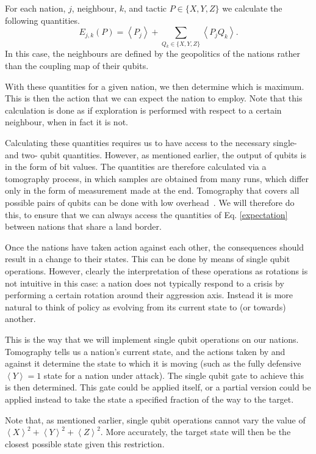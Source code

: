 \documentclass[conference]{IEEEtran}
\begin{document}
For each nation, $j$, neighbour, $k$, and tactic $P  \in \{X,Y,Z\}$ we calculate the following quantities.
\begin{equation} \label{expectation}
E_{j,k} (P) = \left\langle P_j \right\rangle + \sum_{Q_k \in \{X,Y,Z\} } \left\langle P_j Q_k\right\rangle.
\end{equation}
In this case, the neighbours are defined by the geopolitics of the nations rather than the coupling map of their qubits.

With these quantities for a given nation, we then determine which is maximum. This is then the action that we can expect the nation to employ. Note that this calculation is done as if exploration is performed with respect to a certain neighbour, when in fact it is not.

Calculating these quantities requires us to have access to the necessary single- and two- qubit quantities. However, as mentioned earlier, the output of qubits is in the form of bit values. The quantities are therefore calculated via a tomography process, in which samples are obtained from many runs, which differ only in the form of measurement made at the end. Tomography that covers all possible pairs of qubits can be done with low overhead~\cite{garciaperez:19}. We will therefore do this, to ensure that we can always access the quantities of Eq. \ref{expectation} between nations that share a land border.

Once the nations have taken action against each other, the consequences should result in a change to their states. This can be done by means of single qubit operations. However, clearly the interpretation of these operations as rotations is not intuitive in this case: a nation does not typically respond to a crisis by performing a certain rotation around their aggression axis. Instead it is more natural to think of policy as evolving from its current state to (or towards) another.

This is the way that we will implement single qubit operations on our nations. Tomography tells us a nation's current state, and the actions taken by and against it determine the state to which it is moving (such as the fully defensive $\left\langle Y\right\rangle=1$ state for a nation under attack). The single qubit gate to achieve this is then determined. This gate could be applied itself, or a partial version could be applied instead to take the state a specified fraction of the way to the target.

Note that, as mentioned earlier, single qubit operations cannot vary the value of $ \left\langle X\right\rangle^2 + \left\langle Y\right\rangle^2+ \left\langle Z\right\rangle^2$. More accurately, the target state will then be the closest possible state given this restriction.
\end{document}

